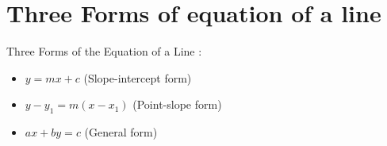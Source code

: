 \documentclass[12pt, a4paper, addpoints]{exam}
\begin{document}
\section*{Three Forms of equation of a line}
\LARGE
\begin{mdframed}[backgroundcolor=gray!20] %
Three Forms of the Equation of a Line :
\begin{itemize}
    \item \( y = mx + c \) \quad (Slope-intercept form)
    \item \( y - y_1 = m(x - x_1) \) \quad (Point-slope form)
    \item \( ax + by  = c \) \quad (General form)
\end{itemize}

\end{mdframed}
\end{document}
